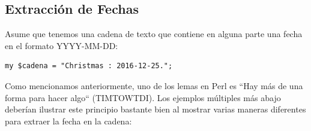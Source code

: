 \subsection{Extracción de Fechas}
\label{extracting_dates}

Asume que tenemos una cadena de texto que contiene en
alguna parte una fecha en el formato YYYY-MM-DD:

\begin{verbatim}
my $cadena = "Christmas : 2016-12-25.";
\end{verbatim}
%

Como mencionamos anteriormente, uno de los lemas en Perl es
``Hay más de una forma para hacer algo`` (TIMTOWTDI). Los ejemplos
múltiples más abajo deberían ilustrar este principio bastante 
bien al mostrar varias maneras diferentes para extraer la fecha
en la cadena:

